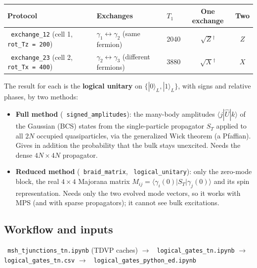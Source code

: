 \documentclass[11pt]{article}
\renewcommand{\code}[1]{\texttt{\hyphenchar\font=-1 #1}}
\newcommand{\ket}[1]{|#1\rangle}
\newcommand{\bra}[1]{\langle#1|}
\begin{document}
\begin{center}
\begin{tabular}{lllcc}
\toprule
Protocol & Exchanges & $T_1$ & One exchange & Two\\
\midrule
\code{exchange\_12} (cell 1, \code{rot\_Tz = 200}) & $\gamma_1\leftrightarrow\gamma_2$ (same fermion) & 2040 & $\sqrt{Z}{}^\dagger$ & $Z$\\
\code{exchange\_23} (cell 2, \code{rot\_Tx = 400}) & $\gamma_2\leftrightarrow\gamma_3$ (different fermions) & 3880 & $\sqrt{X}{}^\dagger$ & $X$\\
\bottomrule
\end{tabular}
\end{center}

The result for each is the \textbf{logical unitary} on $\{\ket0_L,\ket1_L\}$, with signs and relative phases, by two methods:

\begin{itemize}
\item \textbf{Full method} (\code{signed\_amplitudes}): the many-body amplitudes $\bra j\hat U\ket k$ of the Gaussian (BCS) states from the
single-particle propagator $S_T$ applied to all $2N$ occupied quasiparticles, via the generalized Wick theorem (a Pfaffian). Gives in
addition the probability that the bulk stays unexcited. Needs the dense $4N\times4N$ propagator.
\item \textbf{Reduced method} (\code{braid\_matrix}, \code{logical\_unitary}): only the zero-mode block, the real $4\times4$ Majorana matrix
$M_{ij} = \bra{\gamma_i(0)}S_T\ket{\gamma_j(0)}$ and its spin representation. Needs only the two evolved mode vectors, so it works with
MPS (and with sparse propagators); it cannot see bulk excitations.
\end{itemize}

\subsection{Workflow and inputs}

\begin{center}\code{msh\_tjunctions\_tn.ipynb} (TDVP caches) $\to$ \code{logical\_gates\_tn.ipynb} $\to$ \code{logical\_gates\_tn.csv} $\to$ \code{logical\_gates\_python\_ed.ipynb}\end{center}
\end{document}
